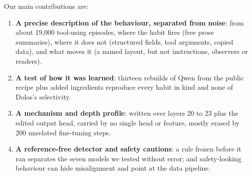 
\noindent Our main contributions are:
\begin{enumerate}
  \item \textbf{A precise description of the behaviour, separated from noise}: from about 19,000
  tool-using episodes, where the habit fires (free prose summaries), where it does not (structured
  fields, tool arguments, copied data), and what moves it (a named layout, but not instructions,
  observers or readers).
  \item \textbf{A test of how it was learned}: thirteen rebuilds of Qwen from the public recipe plus
  added ingredients reproduce every habit in kind and none of Dolos's selectivity.
  \item \textbf{A mechanism and depth profile}: written over layers 20 to 23 plus the edited output
  head, carried by no single head or feature, mostly erased by 200 unrelated fine-tuning steps.
  \item \textbf{A reference-free detector and safety cautions}: a rule frozen before it ran
  separates the seven models we tested without error; and safety-looking behaviour can hide
  misalignment and point at the data pipeline.
\end{enumerate}
